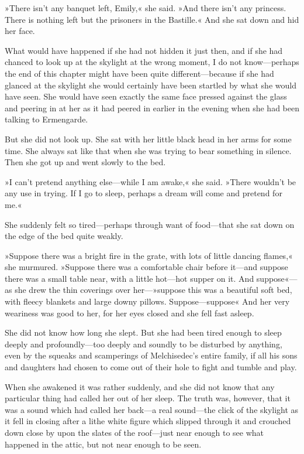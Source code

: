 »There isn't any banquet left, Emily,« she said. »And there isn't any princess. There is nothing left but the prisoners in the Bastille.« And she sat down and hid her face.

What would have happened if she had not hidden it just then, and if she had chanced to look up at the skylight at the wrong moment, I do not know—perhaps the end of this chapter might have been quite different—because if she had glanced at the skylight she would certainly have been startled by what she would have seen. She would have seen exactly the same face pressed against the glass and peering in at her as it had peered in earlier in the evening when she had been talking to Ermengarde.

But she did not look up. She sat with her little black head in her arms for some time. She always sat like that when she was trying to bear something in silence. Then she got up and went slowly to the bed.

»I can't pretend anything else—while I am awake,« she said. »There wouldn't be any use in trying. If I go to sleep, perhaps a dream will come and pretend for me.«

She suddenly felt so tired—perhaps through want of food—that she sat down on the edge of the bed quite weakly.

»Suppose there was a bright fire in the grate, with lots of little dancing flames,« she murmured. »Suppose there was a comfortable chair before it—and suppose there was a small table near, with a little hot—hot supper on it. And suppose«—as she drew the thin coverings over her—»suppose this was a beautiful soft bed, with fleecy blankets and large downy pillows. Suppose—suppose\longdash« And her very weariness was good to her, for her eyes closed and she fell fast asleep.


She did not know how long she slept. But she had been tired enough to sleep deeply and profoundly—too deeply and soundly to be disturbed by anything, even by the squeaks and scamperings of Melchisedec's entire family, if all his sons and daughters had chosen to come out of their hole to fight and tumble and play.

When she awakened it was rather suddenly, and she did not know that any particular thing had called her out of her sleep. The truth was, however, that it was a sound which had called her back—a real sound—the click of the skylight as it fell in closing after a lithe white figure which slipped through it and crouched down close by upon the slates of the roof—just near enough to see what happened in the attic, but not near enough to be seen.

